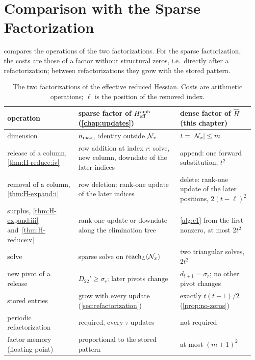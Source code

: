 \section{Comparison with the Sparse Factorization}
\label{sec:dense-comparison}

 compares the operations of the two factorizations. For the sparse
factorization, the costs are those of a factor without structural zeros, i.e.\ directly after a
refactorization; between refactorizations they grow with the stored pattern.

\begin{table}[ht]
\centering
\small
\renewcommand{\arraystretch}{1.3}
\begin{tabular}{>{\raggedright}p{}>{\raggedright}p{}>{\raggedright\arraybackslash}p{}}
\toprule
operation & sparse factor of $H_{\mathrm{eff}}^{\mathrm{emb}}$ (\cref{chap:updates}) & dense factor of $\hat H$ (this chapter) \\
\midrule
dimension & $n_{\max}$, identity outside $\mathcal{N}_x$ & $t = |\mathcal{N}_x|\le m$ \\
release of a column, \ref{thm:H-reduce:iv} & row addition at index $r$: solve, new column, downdate of the later indices & append: one forward substitution, $t^2$ \\
removal of a column, \ref{thm:H-expand:i} & row deletion: rank-one update of the later indices & delete: rank-one update of the later positions, $2(t-\ell)^2$ \\
surplus, \ref{thm:H-expand:iii} and~\ref{thm:H-reduce:v} & rank-one update or downdate along the elimination tree & \cref{alg:c1} from the first nonzero, at most $2t^2$ \\
solve & sparse solve on $\operatorname{reach}_L(\mathcal{N}_x)$ & two triangular solves, $2t^2$ \\
new pivot of a release & $D_{22}'\ge\sigma_r$; later pivots change & $d_{t+1} = \sigma_r$; no other pivot changes \\
stored entries & grow with every update (\cref{sec:refactorization}) & exactly $t(t-1)/2$ (\cref{prop:no-zeros}) \\
periodic refactorization & required, every $\tau$ updates & not required \\
factor memory (floating point) & proportional to the stored pattern & at most $(m+1)^2$ \\
\bottomrule
\end{tabular}
\caption{The two factorizations of the effective reduced Hessian. Costs are arithmetic
operations; $\ell$ is the position of the removed index.}
\label{tab:dense-vs-sparse}
\end{table}

